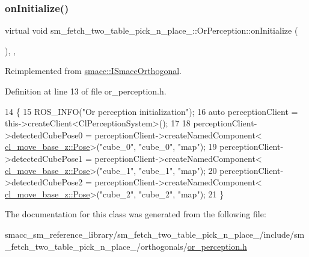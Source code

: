 \subsubsection{\texorpdfstring{on\+Initialize()}{onInitialize()}}
{\footnotesize\ttfamily virtual void sm\+\_\+fetch\+\_\+two\+\_\+table\+\_\+pick\+\_\+n\+\_\+place\+\_\+::\+Or\+Perception\+::on\+Initialize (\begin{DoxyParamCaption}{ }\end{DoxyParamCaption})\hspace{0.3cm}{\ttfamily [inline]}, {\ttfamily [override]}, {\ttfamily [virtual]}}



Reimplemented from \hyperlink{classsmacc_1_1ISmaccOrthogonal_a6bb31c620cb64dd7b8417f8705c79c7a}{smacc\+::\+I\+Smacc\+Orthogonal}.



Definition at line 13 of file or\+\_\+perception.\+h.


\begin{DoxyCode}
14     \{
15         ROS\_INFO(\textcolor{stringliteral}{"Or perception initialization"});
16         \textcolor{keyword}{auto} perceptionClient = this->createClient<ClPerceptionSystem>();
17 
18         perceptionClient->detectedCubePose0 = perceptionClient->createNamedComponent<
      \hyperlink{classcl__move__base__z_1_1Pose}{cl\_move\_base\_z::Pose}>(\textcolor{stringliteral}{"cube\_0"}, \textcolor{stringliteral}{"cube\_0"}, \textcolor{stringliteral}{"map"});
19         perceptionClient->detectedCubePose1 = perceptionClient->createNamedComponent<
      \hyperlink{classcl__move__base__z_1_1Pose}{cl\_move\_base\_z::Pose}>(\textcolor{stringliteral}{"cube\_1"}, \textcolor{stringliteral}{"cube\_1"}, \textcolor{stringliteral}{"map"});
20         perceptionClient->detectedCubePose2 = perceptionClient->createNamedComponent<
      \hyperlink{classcl__move__base__z_1_1Pose}{cl\_move\_base\_z::Pose}>(\textcolor{stringliteral}{"cube\_2"}, \textcolor{stringliteral}{"cube\_2"}, \textcolor{stringliteral}{"map"});
21     \}
\end{DoxyCode}


The documentation for this class was generated from the following file\+:\begin{DoxyCompactItemize}
\item 
smacc\+\_\+sm\+\_\+reference\+\_\+library/sm\+\_\+fetch\+\_\+two\+\_\+table\+\_\+pick\+\_\+n\+\_\+place\+\_/include/sm\+\_\+fetch\+\_\+two\+\_\+table\+\_\+pick\+\_\+n\+\_\+place\+\_/orthogonals/\hyperlink{sm__fetch__two__table__pick__n__place__1_2include_2sm__fetch__two__table__pick__n__place__1_2orthogonals_2or__perception_8h}{or\+\_\+perception.\+h}\end{DoxyCompactItemize}

